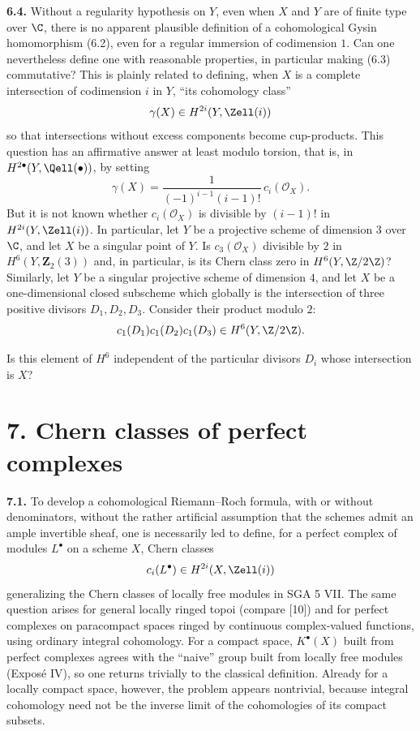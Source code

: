 \textbf{6.4.} Without a regularity hypothesis on $Y$, even when $X$ and $Y$
are of finite type over $\C$, there is no apparent plausible definition of
a cohomological Gysin homomorphism (6.2), even for a regular immersion of
codimension $1$. Can one nevertheless define one with reasonable
properties, in particular making (6.3) commutative? This is plainly related
to defining, when $X$ is a complete intersection of codimension $i$ in
$Y$, ``its cohomology class''
\[
 \gamma(X)\in H^{2i}(Y,\Zell(i))
\]
so that intersections without excess components become cup-products. This
question has an affirmative answer at least modulo torsion, that is, in
$H^{2\bullet}(Y,\Qell(\bullet))$, by setting
\[
 \gamma(X)=\frac{1}{(-1)^{i-1}(i-1)!}\,c_i(\mathcal O_X).
\]
But it is not known whether $c_i(\mathcal O_X)$ is divisible by $(i-1)!$
in $H^{2i}(Y,\Zell(i))$. In particular, let $Y$ be a projective scheme of
dimension $3$ over $\C$, and let $X$ be a singular point of $Y$. Is
$c_3(\mathcal O_X)$ divisible by $2$ in $H^6(Y,\mathbf Z_2(3))$ and, in
particular, is its Chern class zero in $H^6(Y,\Z/2\Z)$? Similarly, let $Y$
be a singular projective scheme of dimension $4$, and let $X$ be a
one-dimensional closed subscheme which globally is the intersection of
three positive divisors $D_1,D_2,D_3$. Consider their product modulo $2$:
\[
 c_1(D_1)c_1(D_2)c_1(D_3)\in H^6(Y,\Z/2\Z).
\]

Is this element of $H^6$ independent of the particular divisors $D_i$
whose intersection is $X$?

\section*{7. Chern classes of perfect complexes}

\textbf{7.1.} To develop a cohomological Riemann--Roch formula, with or
without denominators, without the rather artificial assumption that the
schemes admit an ample invertible sheaf, one is necessarily led to define,
for a perfect complex of modules $L^\bullet$ on a scheme $X$, Chern classes
\[
 c_i(L^\bullet)\in H^{2i}(X,\Zell(i))
\]
generalizing the Chern classes of locally free modules in SGA 5 VII. The
same question arises for general locally ringed topoi (compare [10]) and
for perfect complexes on paracompact spaces ringed by continuous
complex-valued functions, using ordinary integral cohomology. For a compact
space, $K^\bullet(X)$ built from perfect complexes agrees with the ``naive''
group built from locally free modules (Exposé IV), so one returns trivially
to the classical definition. Already for a locally compact space, however,
the problem appears nontrivial, because integral cohomology need not be the
inverse limit of the cohomologies of its compact subsets.

